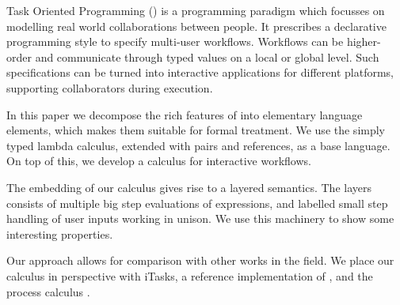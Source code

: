 
Task Oriented Programming (\TOP) is a programming paradigm which focusses on modelling real world collaborations between people.
It prescribes a declarative programming style to specify multi-user workflows.
Workflows can be higher-order and communicate through typed values on a local or global level.
Such specifications can be turned into interactive applications for different platforms,
supporting collaborators during execution.

In this paper we decompose the rich features of \TOP into elementary language elements,
which makes them suitable for formal treatment.
We use the simply typed lambda calculus, extended with pairs and references, as a base language.
On top of this, we develop a calculus for interactive workflows.

The embedding of our calculus gives rise to a layered semantics.
The layers consists of multiple big step evaluations of expressions,
and labelled small step handling of user inputs working in unison.
We use this machinery to show some interesting properties.

Our approach allows for comparison with other works in the field.
We place our calculus in perspective with iTasks, a reference implementation of \TOP,
and the process calculus \CSP.
